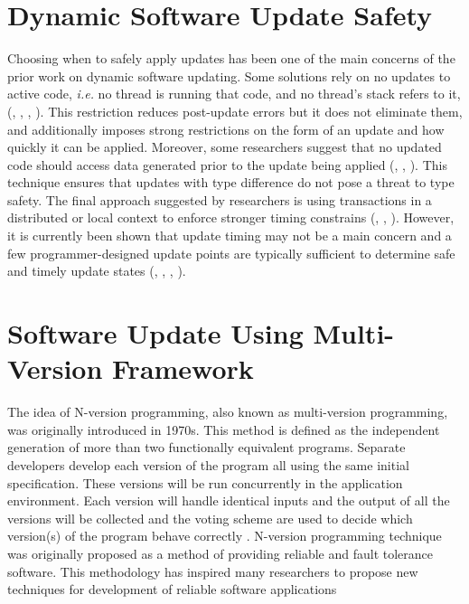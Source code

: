 \documentclass[a4paper,11pt,twoside]{report}
\begin{document}
\section{Dynamic Software Update Safety}
Choosing when to safely apply updates has been one of the main concerns of the prior work on dynamic software updating. Some solutions rely on no updates to active code, \textit{i.e.} no thread is running that code, and no thread's stack refers to it, (\cite{Safety 32}, \cite{Ksplice}, \cite{K42}, \cite{Safety 43} ). This restriction reduces post-update errors but it does not eliminate them, and additionally imposes strong restrictions on the form of an update and how quickly it can be applied. Moreover, some researchers suggest that no updated code should access data generated prior to the update being applied (\cite{Safety 213}, \cite{Safety 214}, \cite{Safety 267}). This technique ensures that updates with type difference do not pose a threat to type safety. The final approach suggested by researchers is using transactions in a distributed or local context to enforce stronger timing constrains (\cite{Safety 173}, \cite{Safety 215}, \cite{Safety 279}). However, it is currently been shown that update timing may not be a main concern and a few programmer-designed update points are typically sufficient to determine safe and timely update states (\cite{Safety 213}, \cite{Kitsune}, \cite{Safety 131}, \cite{Safety 108}). 

\section{Software Update Using Multi-Version Framework} \label{upgrade1} 
The idea of N-version programming, also known as multi-version programming, was originally introduced in 1970s. This method is defined as the independent generation of more than two functionally equivalent programs. Separate developers develop each version of the program all using the same initial specification. These versions will be run concurrently in the application environment. Each version will handle identical inputs and the output of all the versions will be collected and the voting scheme are used to decide which version(s) of the program behave correctly \cite{N-version programming}. N-version programming technique was originally proposed as a method of providing reliable and fault tolerance software. This methodology has inspired many researchers to propose new techniques for development of reliable software applications 
\end{document}
